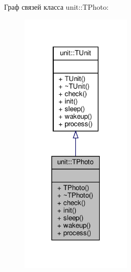 Граф связей класса unit\+:\+:T\+Photo\+:\nopagebreak
\begin{figure}[H]
\begin{center}
\leavevmode
\includegraphics[width=150pt]{classunit_1_1_t_photo__coll__graph}
\end{center}
\end{figure}
